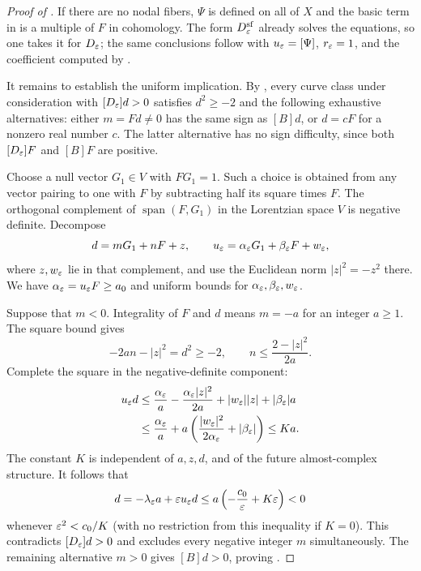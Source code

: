 \begin{proof}[Proof of ]
If there are no nodal fibers, $\Psi$ is defined on all of $X$ and
the basic term in  is a multiple of
$F$ in cohomology.  The form $D^{\mathrm{sf}}_\varepsilon$ already solves
the equations, so one takes it for $D_\varepsilon$; the same conclusions
follow with $u_\varepsilon=[\Psi]$, $r_\varepsilon=1$, and the coefficient
computed by .

It remains to establish the uniform implication.  By
, every curve class under consideration with
$[D_\varepsilon]d>0$ satisfies $d^2\ge-2$ and the following exhaustive
alternatives: either $m=Fd\ne0$ has the same sign as $[B]d$,
or $d=cF$ for a nonzero real number $c$.  The latter alternative
has no sign difficulty, since both $[D_\varepsilon]F$ and $[B]F$ are
positive.

Choose a null vector $G_1\in V$ with $FG_1=1$.  Such a choice is
obtained from any vector pairing to one with $F$ by subtracting
half its square times $F$.  The orthogonal complement of
$\operatorname{span}(F,G_1)$ in the Lorentzian space $V$ is
negative definite.  Decompose
\[
  d=mG_1+nF+z,\qquad
  u_\varepsilon=\alpha_\varepsilon G_1+\beta_\varepsilon F+w_\varepsilon,
\]
where $z,w_\varepsilon$ lie in that complement, and use the Euclidean norm
$|z|^2=-z^2$ there.  We have
$\alpha_\varepsilon=u_\varepsilon F\ge a_0$ and uniform bounds for
$\alpha_\varepsilon,\beta_\varepsilon,w_\varepsilon$.

Suppose that $m<0$.  Integrality of $F$ and $d$ means
$m=-a$ for an integer $a\ge1$.  The square bound gives
\begin{equation}
  -2an-|z|^2=d^2\ge-2,
  \qquad
  n\le\frac{2-|z|^2}{2a}.
  \label{eq:auxiliary-negative-intersection}
\end{equation}
Complete the square in the negative-definite component:
\begin{align}
  u_\varepsilon d
   &\le\frac{\alpha_\varepsilon}{a}
      -\frac{\alpha_\varepsilon|z|^2}{2a}
      +|w_\varepsilon||z|+|\beta_\varepsilon|a \notag\\
   &\le\frac{\alpha_\varepsilon}{a}
      +a\left(\frac{|w_\varepsilon|^2}{2\alpha_\varepsilon}
                    +|\beta_\varepsilon|\right)
    \le Ka.
  \label{eq:auxiliary-completed-square}
\end{align}
The constant $K$ is independent of $a,z,d$, and of the future
almost-complex structure.  It follows that
\begin{equation}
  [D_\eps]d
   =-\lambda_\eps a+\eps u_\eps d
   \le a\left(-\frac{c_0}{\eps}+K\eps\right)<0
  \label{eq:auxiliary-chamber-exclusion}
\end{equation}
whenever $\varepsilon^2<c_0/K$ (with no restriction from this inequality
if $K=0$).  This contradicts $[D_\varepsilon]d>0$ and excludes every
negative integer $m$ simultaneously.  The remaining alternative
$m>0$ gives $[B]d>0$, proving
.


\end{proof}
